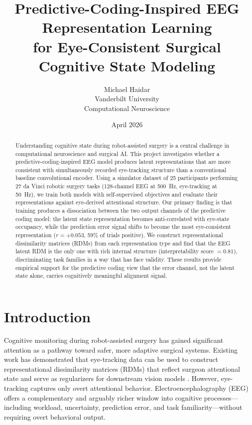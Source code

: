 \documentclass[11pt, letterpaper]{article}
\title{%
  \textbf{Predictive-Coding-Inspired EEG Representation Learning\\
  for Eye-Consistent Surgical Cognitive State Modeling}
}
\author{Michael Haidar\\[4pt]
  \small Vanderbilt University\\
  \small Computational Neuroscience
}
\date{April 2026}
\begin{document}
\maketitle
\thispagestyle{empty}

\begin{abstract}
Understanding cognitive state during robot-assisted surgery is a central challenge in
computational neuroscience and surgical AI. This project investigates whether a
predictive-coding-inspired EEG model produces latent representations that are more
consistent with simultaneously recorded eye-tracking structure than a conventional
baseline convolutional encoder. Using a simulator dataset of 25 participants performing
27 da Vinci robotic surgery tasks (128-channel EEG at 500~Hz, eye-tracking at 50~Hz),
we train both models with self-supervised objectives and evaluate their representations
against eye-derived attentional structure. Our primary finding is that training
produces a dissociation between the two output channels of the predictive coding model:
the latent state representation becomes anti-correlated with eye-state occupancy, while
the prediction error signal shifts to become the most eye-consistent representation
($r = +0.053$, 59\% of trials positive). We construct representational dissimilarity
matrices (RDMs) from each representation type and find that the EEG latent RDM is the
only one with rich internal structure (interpretability score $= 0.81$), discriminating
task families in a way that has face validity. These results provide empirical support
for the predictive coding view that the error channel, not the latent state alone,
carries cognitively meaningful alignment signal.
\end{abstract}

\vspace{1em}
\tableofcontents
\newpage

\section{Introduction}

Cognitive monitoring during robot-assisted surgery has gained significant attention as a
pathway toward safer, more adaptive surgical systems. Existing work has demonstrated
that eye-tracking data can be used to construct representational dissimilarity matrices
(RDMs) that reflect surgeon attentional state and serve as regularizers for downstream
vision models \citep{shafiei2023eeg}. However, eye-tracking captures only overt
attentional behavior. Electroencephalography (EEG) offers a complementary and arguably
richer window into cognitive processes---including workload, uncertainty, prediction
error, and task familiarity---without requiring overt behavioral output.
\end{document}
